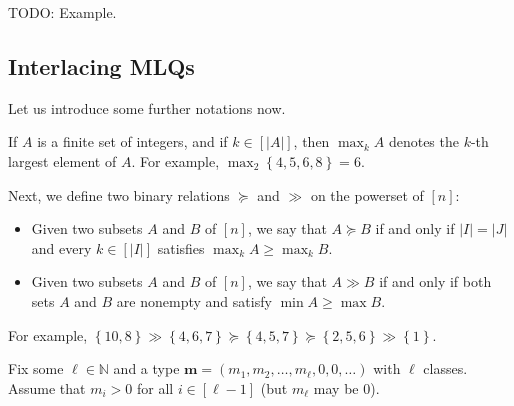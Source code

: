 \documentclass[reqno]{amsart}
\newcommand{\0}{\phantom{c}}
\newcommand{\defn}[1]{{\color{darkred}\emph{#1}}} %
\theoremstyle{plain}
\theoremstyle{definition}
\numberwithin{equation}{section}
\begin{document}
TODO: Example.

\subsection{Interlacing MLQs}

Let us introduce some further notations now.

If $A$ is a finite set of integers, and if $k\in\left[  \left\vert
A\right\vert \right]  $, then \defn{$\max_k A$} denotes the $k$-th largest
element of $A$. For example, $\max\nolimits_{2}\left\{  4,5,6,8\right\}  =6$.

Next, we define two binary relations $\succeq$ and $\gg$ on the powerset of
$\left[  n \right]  $:

\begin{itemize}
\item Given two subsets $A$ and $B$ of $\left[  n \right]  $, we say that
\defn{$A\succeq B$} if and only if $\left\vert I\right\vert =\left\vert
J\right\vert $ and every $k\in\left[  \left\vert I\right\vert \right]  $
satisfies $\max\nolimits_{k}A\geq\max\nolimits_{k}B$.

\item Given two subsets $A$ and $B$ of $\left[  n \right]  $, we say that
\defn{$A \gg B$} if and only if both sets $A$ and $B$ are nonempty and satisfy
$\min A \geq\max B$.
\end{itemize}

For example, $\left\{  10,8\right\}  \gg\left\{  4,6,7\right\}  \succeq
\left\{  4,5,7\right\}  \succeq\left\{  2,5,6\right\}  \gg\left\{  1\right\}
$.

Fix some $\ell\in\mathbb{N}$ and a type $\mathbf{m}=\left(  m_{1},m_{2}%
,\ldots,m_{\ell},0,0,\ldots\right)  $ with $\ell$ classes. Assume that
$m_{i}>0$ for all $i\in\left[  \ell-1\right]  $ (but $m_{\ell}$ may be $0$).
\end{document}
